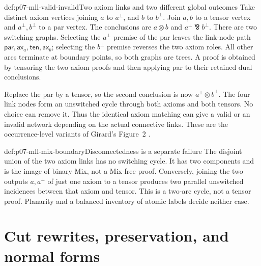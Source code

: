 \begin{hbexample}{def:p07-mll-valid-invalid}{Two axiom links and two different global outcomes}
Take distinct axiom vertices joining \(a\) to \(a^\perp\), and \(b\)
to \(b^\perp\). Join \(a,b\) to a tensor vertex and
\(a^\perp,b^\perp\) to a par vertex. The conclusions are
\(a\otimes b\) and \(a^\perp\bindnasrepma b^\perp\).
There are two switching graphs. Selecting the \(a^\perp\) premise of
the par leaves the link-node path
\(\mathsf{par},\mathsf{ax}_a,\mathsf{ten},\mathsf{ax}_b\);
selecting the \(b^\perp\) premise reverses the two axiom roles.
All other arcs terminate at boundary points, so both graphs are trees.
A proof is obtained by tensoring the two axiom proofs and then applying
par to their retained dual conclusions.

Replace the par by a tensor, so the second conclusion is now
\(a^\perp\otimes b^\perp\). The four link nodes form an unswitched
cycle through both axioms and both tensors. No choice can remove it.
Thus the identical axiom matching can give a valid or an invalid
network depending on the actual connective links. These are the
occurrence-level variants of Girard's Figure~2
\cite[p.~29]{Girard1987AuthorHosted}.
\end{hbexample}

\begin{hbexample}{def:p07-mll-mix-boundary}{Disconnectedness is a separate failure}
The disjoint union of the two axiom links has no switching cycle.
It has two components and is the image of binary Mix, not a Mix-free
proof. Conversely, joining the two outputs \(a,a^\perp\) of just one
axiom to a tensor produces two parallel unswitched incidences between
that axiom and tensor. This is a two-arc cycle, not a tensor proof.
Planarity and a balanced inventory of atomic labels decide neither case.
\end{hbexample}

\section{Cut rewrites, preservation, and normal forms}
\label{sec:p07-mll-net-cut}

